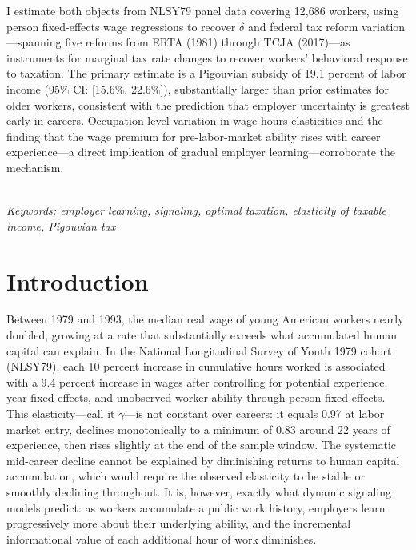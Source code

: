 \documentclass[12pt]{article}
\theoremstyle{definition}
\theoremstyle{remark}
\begin{document}
\begin{titlepage}
\begin{center}
\begin{minipage}{0.85\textwidth}
I estimate both objects from NLSY79 panel data covering 12,686 workers, using person
fixed-effects wage regressions to recover $\delta$ and federal tax reform
variation---spanning five reforms from ERTA (1981) through TCJA (2017)---as instruments for
marginal tax rate changes to recover workers' behavioral response to taxation. The primary
estimate is a Pigouvian subsidy of 19.1 percent of labor income (95\% CI: [15.6\%, 22.6\%]),
substantially larger than prior estimates for older workers, consistent with the prediction
that employer uncertainty is greatest early in careers. Occupation-level variation in
wage-hours elasticities and the finding that the wage premium for pre-labor-market ability
rises with career experience---a direct implication of gradual employer learning---corroborate
the mechanism.
\end{minipage}
\vspace{2cm}\\
\small\textit{Keywords: employer learning, signaling, optimal taxation, elasticity of taxable income, Pigouvian tax}
\end{center}
\end{titlepage}

\section{Introduction}
\label{sec:intro}

Between 1979 and 1993, the median real wage of young American workers nearly doubled, growing
at a rate that substantially exceeds what accumulated human capital can explain. In the National
Longitudinal Survey of Youth 1979 cohort (NLSY79), each 10 percent increase in cumulative hours
worked is associated with a 9.4 percent increase in wages after controlling for potential
experience, year fixed effects, and unobserved worker ability through person fixed effects. This
elasticity—call it $\gamma$—is not constant over careers: it equals 0.97 at labor market entry,
declines monotonically to a minimum of 0.83 around 22 years of experience, then rises slightly
at the end of the sample window. The systematic mid-career decline cannot be explained by
diminishing returns to human capital accumulation, which would require the observed elasticity
to be stable or smoothly declining throughout. It is, however, exactly what dynamic signaling
models predict: as workers accumulate a public work history, employers learn progressively more
about their underlying ability, and the incremental informational value of each additional hour
of work diminishes.
\end{document}
